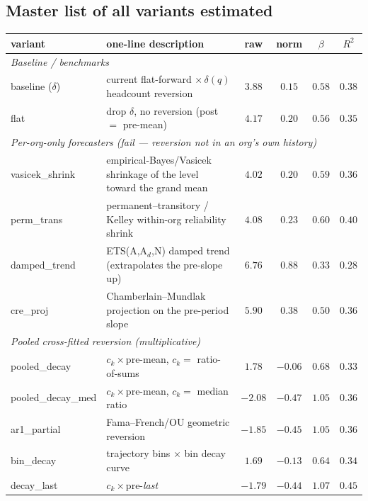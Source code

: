 \documentclass[11pt]{article}
\begin{document}
\subsection{Master list of all variants estimated}
\begin{table}[h]\centering\footnotesize
\begin{tabular}{llcccc}
\toprule
variant & one-line description & raw & norm & $\beta$ & $R^2$\\
\midrule
\multicolumn{6}{l}{\emph{Baseline / benchmarks}}\\
baseline ($\delta$)   & current flat-forward $\times\,\delta(q)$ headcount reversion              & $3.88$ & $0.15$ & $0.58$ & $0.38$\\
flat                  & drop $\delta$, no reversion (post $=$ pre-mean)                          & $4.17$ & $0.20$ & $0.56$ & $0.35$\\
\multicolumn{6}{l}{\emph{Per-org-only forecasters (fail --- reversion not in an org's own history)}}\\
vasicek\_shrink       & empirical-Bayes/Vasicek shrinkage of the level toward the grand mean     & $4.02$ & $0.20$ & $0.59$ & $0.36$\\
perm\_trans           & permanent--transitory / Kelley within-org reliability shrink             & $4.08$ & $0.23$ & $0.60$ & $0.40$\\
damped\_trend         & ETS(A,A$_d$,N) damped trend (extrapolates the pre-slope up)              & $6.76$ & $0.88$ & $0.33$ & $0.28$\\
cre\_proj             & Chamberlain--Mundlak projection on the pre-period slope                  & $5.90$ & $0.38$ & $0.50$ & $0.36$\\
\multicolumn{6}{l}{\emph{Pooled cross-fitted reversion (multiplicative)}}\\
pooled\_decay         & $c_k\times$pre-mean, $c_k=$ ratio-of-sums                               & $1.78$ & $-0.06$ & $0.68$ & $0.33$\\
pooled\_decay\_med    & $c_k\times$pre-mean, $c_k=$ median ratio                                 & $-2.08$ & $-0.47$ & $1.05$ & $0.36$\\
ar1\_partial          & Fama--French/OU geometric reversion                                     & $-1.85$ & $-0.45$ & $1.05$ & $0.36$\\
bin\_decay            & trajectory bins $\times$ bin decay curve                                & $1.69$ & $-0.13$ & $0.64$ & $0.34$\\
decay\_last           & $c_k\times$pre-\emph{last}                                              & $-1.79$ & $-0.44$ & $1.07$ & $0.45$\\

\end{tabular}
\end{table}
\end{document}
